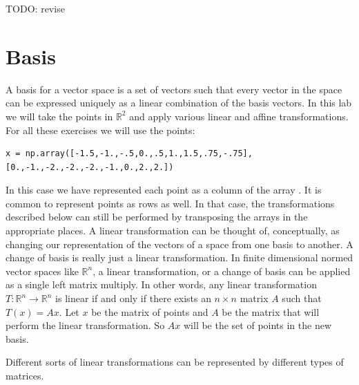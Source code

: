 \label{lab:ChangeBasis}


TODO: revise

\section*{Basis}
A basis for a vector space is a set of vectors such that every vector in the space can be expressed uniquely as a linear combination of the basis vectors.
In this lab we will take the points in $\mathbb{R}^2$ and apply various linear and affine transformations.
For all these exercises we will use the points:
\begin{lstlisting}
x = np.array([-1.5,-1.,-.5,0.,.5,1.,1.5,.75,-.75],[0.,-1.,-2.,-2.,-2.,-1.,0.,2.,2.])
\end{lstlisting}
In this case we have represented each point as a column of the array .
It is common to represent points as rows as well.
In that case, the transformations described below can still be performed by transposing the arrays in the appropriate  places.
A linear transformation can be thought of, conceptually, as changing our representation of the vectors of a space from one basis to another.
A change of basis is really just a linear transformation.
In finite dimensional normed vector spaces like $\mathbb{R}^n$, a linear transformation, or a change of basis can be applied as a single left matrix multiply.
In other words, any linear transformation $T : \mathbb{R}^n \to \mathbb{R}^n$ is linear if and only if there exists an $n\times n$ matrix $A$ such that $T\left(x\right) = A x$.
Let $x$ be the matrix of points and $A$ be the matrix that will perform the linear transformation.
So $A x$ will be the set of points in the new basis.

Different sorts of linear transformations can be represented by different types of matrices.

